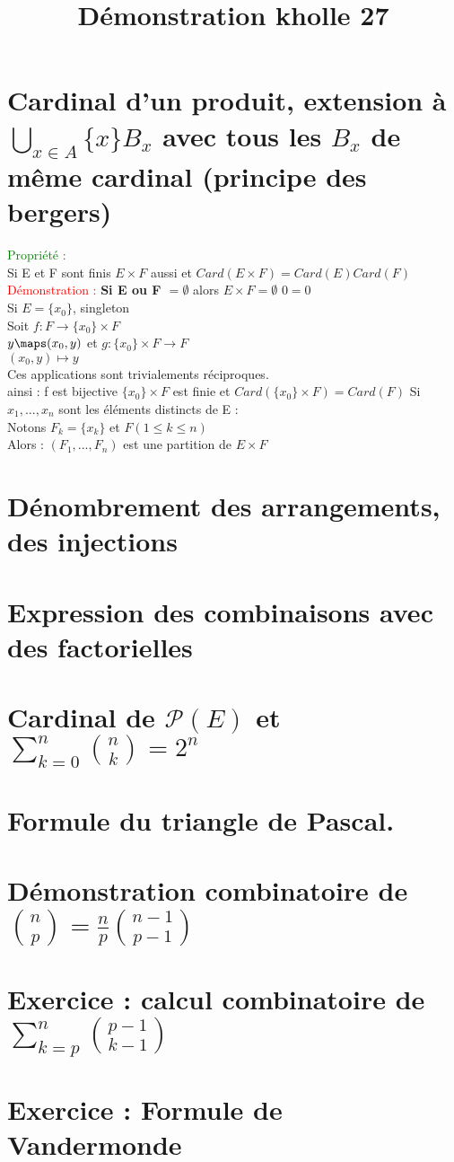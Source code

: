 \documentclass{article}
\begin{document}
\title{Démonstration kholle 27}
\date{}
\maketitle
\renewcommand{\thesection}{\Roman{section}}
\setlength{\parindent}{1.5cm}
\section{Cardinal d'un produit, extension à $\bigcup_{x\in A} \lbrace x \rbrace B_x$ avec tous les $B_x$ de  même cardinal (principe des bergers)}
\textcolor{green}{Propriété :} \\
Si E et F sont finis $E \times F $ aussi et $Card(E \times F)= Card(E) Card(F)$ \\
\textcolor{red}{Démonstration :}
{\bf \boldmath Si E ou F $= \emptyset$} alors $E \times F= \emptyset$ $0=0$ \\
Si $E= \lbrace x_0 \rbrace$, singleton \\
Soit $f: F \rightarrow \lbrace x_0 \rbrace \times F $ \\
$y \maps (x_0,y)$
et $g : \lbrace x_0 \rbrace \times F \rightarrow F$ \\
$(x_0,y) \mapsto y$ \\
Ces applications sont trivialements réciproques. \\
ainsi : f est bijective $\lbrace x_0 \rbrace \times F$ est finie et $Card(\lbrace x_0 \rbrace \times F)= Card(F) $
Si $x_1,..., x_n$ sont les éléments distincts de E : \\
Notons $F_k= \lbrace x_k \rbrace $ et $F(1 \leq k \leq n)$ \\
Alors : $(F_1,...,F_n)$ est une partition de $E \times F$
\section{Dénombrement des arrangements, des injections}
\section{Expression des combinaisons avec des factorielles}
\section{Cardinal de $\mathcal P (E)$ et $\sum_{k=0}^n \binom{n}{k}=2^n$ }
\section{Formule du triangle de Pascal.}
\section{Démonstration combinatoire de $\binom{n}{p}= \frac n p \binom{n-1}{p-1}$}
\section{Exercice : calcul combinatoire de $\sum_{k=p}^n \binom{p-1}{k-1} $ }
\section{ Exercice : Formule de Vandermonde}
\end{document}
